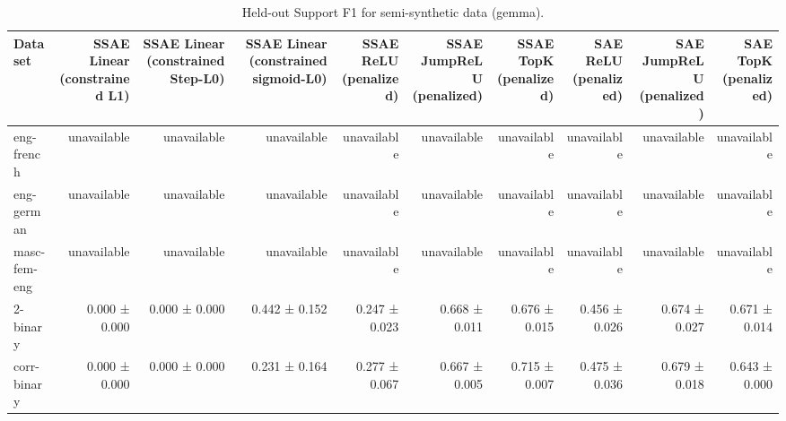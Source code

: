 \begin{table}[t]
\centering
\caption{Held-out Support F1 for semi-synthetic data (gemma).}
\label{tab:semisynthetic-gemma-support-f1}
\begin{tabular}{lrrrrrrrrr}
\toprule
Dataset & SSAE Linear (constrained L1) & SSAE Linear (constrained Step-L0) & SSAE Linear (constrained sigmoid-L0) & SSAE ReLU (penalized) & SSAE JumpReLU (penalized) & SSAE TopK (penalized) & SAE ReLU (penalized) & SAE JumpReLU (penalized) & SAE TopK (penalized) \\
\midrule
eng-french & unavailable & unavailable & unavailable & unavailable & unavailable & unavailable & unavailable & unavailable & unavailable \\
eng-german & unavailable & unavailable & unavailable & unavailable & unavailable & unavailable & unavailable & unavailable & unavailable \\
masc-fem-eng & unavailable & unavailable & unavailable & unavailable & unavailable & unavailable & unavailable & unavailable & unavailable \\
2-binary & 0.000 ± 0.000 & 0.000 ± 0.000 & 0.442 ± 0.152 & 0.247 ± 0.023 & 0.668 ± 0.011 & 0.676 ± 0.015 & 0.456 ± 0.026 & 0.674 ± 0.027 & 0.671 ± 0.014 \\
corr-binary & 0.000 ± 0.000 & 0.000 ± 0.000 & 0.231 ± 0.164 & 0.277 ± 0.067 & 0.667 ± 0.005 & 0.715 ± 0.007 & 0.475 ± 0.036 & 0.679 ± 0.018 & 0.643 ± 0.000 \\
\bottomrule
\end{tabular}
\end{table}
